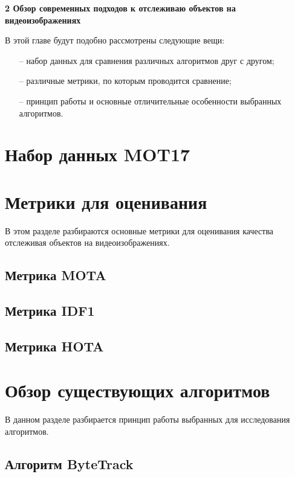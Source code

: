 \newpage
\begin{flushleft}
  \textbf{\large 2 Обзор современных подходов к отслеживаю объектов на видеоизображениях}
\end{flushleft}
В этой главе будут подобно рассмотрены следующие вещи:
\begin{itemize}
  \item[--] набор данных для сравнения различных алгоритмов друг с другом;
  \item[--] различные метрики, по которым проводится сравнение;
  \item[--] принцип работы и основные отличительные особенности выбранных алгоритмов. 
\end{itemize}
\section{Набор данных MOT17}

\section{Метрики для оценивания}
В этом разделе разбираются основные метрики для оценивания качества отслеживая объектов на видеоизображениях.
\subsection{Метрика MOTA}

\subsection{Метрика IDF1}

\subsection{Метрика HOTA}


\section{Обзор существующих алгоритмов}
В данном разделе разбирается принцип работы выбранных для исследования алгоритмов.
\subsection{Алгоритм ByteTrack}


